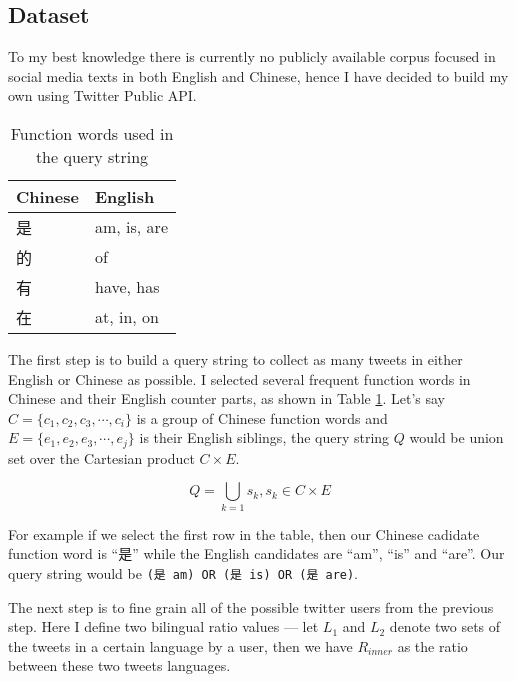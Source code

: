 \documentclass[11pt,a4paper]{article}
\begin{document}
\subsection{Dataset}

To my best knowledge there is currently no publicly available corpus focused in social media texts in both English and Chinese, hence I have decided to build my own using Twitter Public API.

\begin{CJK*}{UTF8}{gbsn}

\begin{table}[t]
  \begin{center}
  \begin{tabular}{|l|l|}
  \hline \bf Chinese & \bf English \\ \hline
  是 & am, is, are \\
  的 & of \\
  有 & have, has \\
  在 & at, in, on \\
  \hline
  \end{tabular}
  \end{center}
  \caption{\label{tab:query-func-words-table} Function words used in the query string}
\end{table}

The first step is to build a query string to collect as many tweets in either English or Chinese as possible. I selected several frequent function words in Chinese and their English counter parts, as shown in Table \ref{tab:query-func-words-table}.  Let's say $C=\{c_1, c_2, c_3, \cdots, c_i\}$ is a group of Chinese function words and $E=\{e_1, e_2, e_3, \cdots, e_j\}$ is their English siblings, the query string $Q$ would be union set over the Cartesian product $C\times E$.

\begin{equation}
  Q=\bigcup_{k=1}s_k, s_k \in C \times E
\end{equation}

For example if we select the first row in the table, then our Chinese cadidate function word is ``是'' while the English candidates are ``am'', ``is'' and ``are''. Our query string would be \verb|(是 am) OR (是 is) OR (是 are)|.

\end{CJK*}

The next step is to fine grain all of the possible twitter users from the previous step. Here I define two bilingual ratio values --- let $L_1$ and $L_2$ denote two sets of the tweets in a certain language by a user, then we have $R_{inner}$ as the ratio between these two tweets languages.
\end{document}
